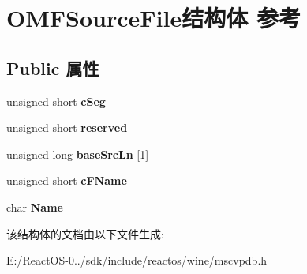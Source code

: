 \hypertarget{struct_o_m_f_source_file}{}\section{O\+M\+F\+Source\+File结构体 参考}
\label{struct_o_m_f_source_file}
\subsection*{Public 属性}
\begin{DoxyCompactItemize}
\item 
\mbox{\label{struct_o_m_f_source_file_aa84db6452a78f555b92312375ee7b626}} 
unsigned short {\bfseries c\+Seg}
\item 
\mbox{\label{struct_o_m_f_source_file_a412fcbc585effb927ef3c19f7d0eea36}} 
unsigned short {\bfseries reserved}
\item 
\mbox{\label{struct_o_m_f_source_file_a3ddd3b49881bbd75b5ac976915590ba4}} 
unsigned long {\bfseries base\+Src\+Ln} \mbox{[}1\mbox{]}
\item 
\mbox{\label{struct_o_m_f_source_file_a3909850f2e4f5f36d2bc3142025824c3}} 
unsigned short {\bfseries c\+F\+Name}
\item 
\mbox{\label{struct_o_m_f_source_file_ad77fcc381420771bfe6b226a0fae48ab}} 
char {\bfseries Name}
\end{DoxyCompactItemize}


该结构体的文档由以下文件生成\+:\begin{DoxyCompactItemize}
\item 
E\+:/\+React\+O\+S-\/0../sdk/include/reactos/wine/mscvpdb.\+h\end{DoxyCompactItemize}
